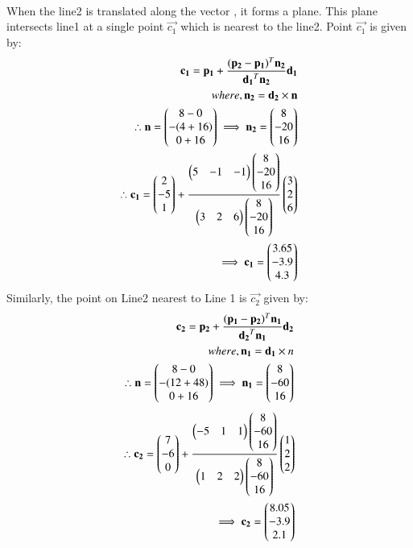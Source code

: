 \documentclass[journal,12pt,twocolumn]{IEEEtran}
\begin{document}
\\
When the line2 is translated along the vector , it forms a plane. This plane intersects line1 at a single point $\vec{c_1}$ which is nearest to the line2. Point $\vec{c_1}$ is given by:
\\
\begin{align}
\mathbf{c_1}=\mathbf{p_1}+\frac{(\mathbf{p_2}-\mathbf{p_1})^T \mathbf{n_2}}{\mathbf{d_1}^T \mathbf{n_2}}\mathbf{d_1} \\
where, \mathbf{n_2}=\mathbf{d_2}\times \mathbf{n}\\
 \therefore \mathbf{n}=\begin{pmatrix}8-0 \\ -(4+16) \\ 0+16\end{pmatrix}
\implies \mathbf{n_2}=\begin{pmatrix}8 \\ -20 \\ 16\end{pmatrix}\\
\therefore \mathbf{c_1}= \begin{pmatrix}2\\-5\\1\end{pmatrix}+\frac{\begin{pmatrix}5&-1&-1\end{pmatrix} \begin{pmatrix}8\\-20\\16\end{pmatrix}}{\begin{pmatrix}3&2&6\end{pmatrix} \begin{pmatrix}8\\-20\\16\end{pmatrix}}\begin{pmatrix}3\\2\\6\end{pmatrix}\\
\implies \mathbf{c_1}=\begin{pmatrix}3.65\\-3.9\\4.3\end{pmatrix}
\end{align}
Similarly, the point on Line2 nearest to Line 1 is $\vec{c_2}$ given by:\\
\begin{align}
\mathbf{c_2}=\mathbf{p_2}+\frac{(\mathbf{p_1}-\mathbf{p_2})^T \mathbf{n_1}}{\mathbf{d_2}^T \mathbf{n_1}}\mathbf{d_2} \\
where, \mathbf{n_1}=\mathbf{d_1}\times n\\
 \therefore \mathbf{n}=\begin{pmatrix}8-0 \\ -(12+48) \\ 0+16\end{pmatrix}
\implies \mathbf{n_1}=\begin{pmatrix}8 \\ -60 \\ 16\end{pmatrix}
\end{align}
\begin{align}
\therefore \mathbf{c_2}= \begin{pmatrix}7\\-6\\0\end{pmatrix}+\frac{\begin{pmatrix}-5&1&1\end{pmatrix} \begin{pmatrix}8\\-60\\16\end{pmatrix}}{\begin{pmatrix}1&2&2\end{pmatrix} \begin{pmatrix}8\\-60\\16\end{pmatrix}}\begin{pmatrix}1\\2\\2\end{pmatrix}\\
\implies \mathbf{c_2}=\begin{pmatrix}8.05\\-3.9\\2.1\end{pmatrix}
\end{align}
\end{document}
